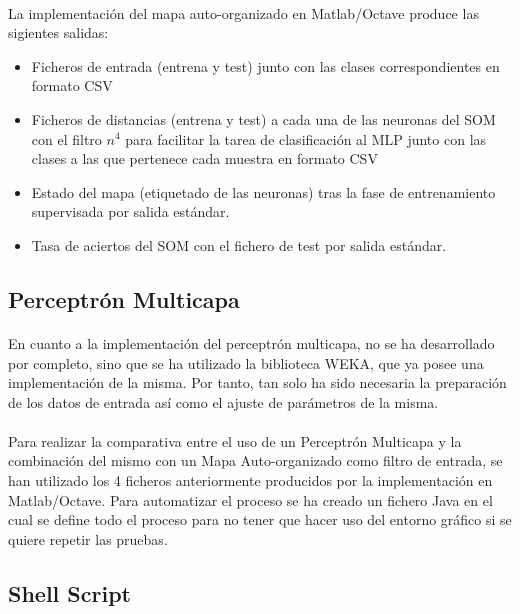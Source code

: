 \documentclass[10pt, a4paper,spanish]{article}
\begin{document}
			\paragraph{}
			La implementación del mapa auto-organizado en Matlab/Octave produce las sigientes salidas:

			\begin{itemize}
				\item Ficheros de entrada (entrena y test) junto con las clases correspondientes en formato CSV
				\item Ficheros de distancias (entrena y test) a cada una de las neuronas del SOM con el filtro $n^4$ para facilitar la tarea de clasificación al MLP  junto con las clases a las que pertenece cada muestra en formato CSV
				\item Estado del mapa (etiquetado de las neuronas) tras la fase de entrenamiento supervisada por salida estándar.
				\item Tasa de aciertos del SOM con el fichero de test por salida estándar.
			\end{itemize}

		\subsection{Perceptrón Multicapa}

			\paragraph{}
			En cuanto a la implementación del perceptrón multicapa, no se ha desarrollado por completo, sino que se ha utilizado la biblioteca WEKA, que ya posee una implementación de la misma. Por tanto, tan solo ha sido necesaria la preparación de los datos de entrada así como el ajuste de parámetros de la misma.

			\paragraph{}
			Para realizar la comparativa entre el uso de un Perceptrón Multicapa y la combinación del mismo con un Mapa Auto-organizado como filtro de entrada, se han utilizado los 4 ficheros anteriormente producidos por la implementación en Matlab/Octave. Para automatizar el proceso se ha creado un fichero Java en el cual se define todo el proceso para no tener que hacer uso del entorno gráfico si se quiere repetir las pruebas.

		\subsection{Shell Script}
\end{document}
